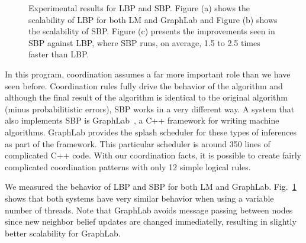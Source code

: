 \begin{figure}[ht!]
   \begin{center}
   \end{center}
   \caption{Experimental results for LBP and SBP. Figure (a) shows the
      scalability of LBP for both LM and GraphLab and Figure (b) shows the
      scalability of SBP. Figure (c) presents the
      improvements seen in SBP against LBP, where SBP runs, on average, 1.5 to 2.5
      times faster than LBP.}
   \label{results:splash_bp}
\end{figure}


In this program, coordination assumes a far more important role than we have
seen before. Coordination rules fully drive the behavior of the algorithm and
although the final result of the algorithm is identical to the original
algorithm (minus probabilitistic errors), SBP works in a very different way.
A system that also implements SBP is
GraphLab~\cite{GraphLab2010}, a C++ framework for writing machine algorithms.
GraphLab provides the splash scheduler for these types of inferences as part of
the framework. This particular scheduler is around 350 lines of complicated C++ code.
With our coordination facts, it is possible to create fairly complicated coordination
patterns with only 12 simple logical rules.

We measured the behavior of LBP and SBP for both LM and GraphLab.
Fig.~\ref{results:splash_bp} shows that both systems have very similar behavior
when using a variable number of threads.
Note that GraphLab avoids message passing between nodes since new neighbor
belief updates are changed immediatelly, resulting in slightly better
scalability for GraphLab.

